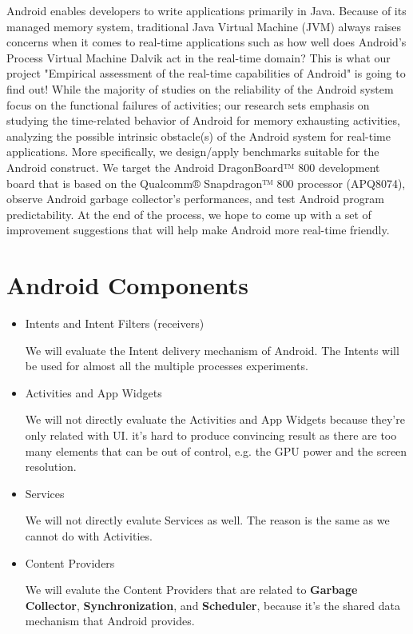 \documentclass[11pt]{article}
\begin{document}
Android enables developers to write applications primarily in Java.  Because of its managed memory system, traditional Java Virtual Machine (JVM) always raises concerns when it comes to real-time applications such as how well does Android’s Process Virtual Machine Dalvik act in the real-time domain? This is what our project "Empirical assessment of the real-time capabilities of Android" is going to find out! While the majority of studies on the reliability of the Android system focus on the functional failures of activities; our research sets emphasis on studying the time-related behavior of Android for memory exhausting activities, analyzing the possible intrinsic obstacle(s) of the Android system for real-time applications. More specifically, we design/apply benchmarks suitable for the Android construct.  We target the Android DragonBoard™ 800 development board that is based on the Qualcomm® Snapdragon™ 800 processor (APQ8074), observe Android garbage collector’s performances, and test Android program predictability. At the end of the process, we hope to come up with a set of improvement suggestions that will help make Android more real-time friendly.

\section{Android Components}
\label{sec-2}
\begin{itemize}
\item Intents and Intent Filters (receivers)

We will evaluate the Intent delivery mechanism of Android.
The Intents will be used for almost all the multiple processes experiments.

\item Activities and App Widgets

We will not directly evaluate the Activities and App Widgets because they're only related with UI.
it's hard to produce convincing result as there are too many elements that can be out of control,
e.g. the GPU power and the screen resolution.

\item Services

We will not directly evalute Services as well. The reason is the same as we cannot do with Activities.

\item Content Providers

We will evalute the Content Providers that are related to \textbf{Garbage Collector}, \textbf{Synchronization},
and \textbf{Scheduler}, because it's the shared data mechanism that Android provides.
\end{itemize}
\end{document}
